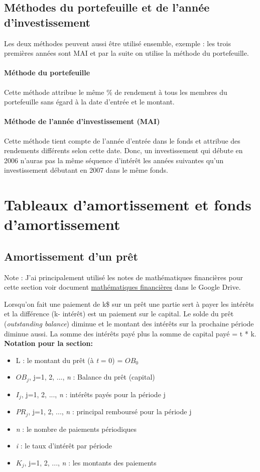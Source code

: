 \documentclass[11pt,french]{report}
\begin{document}
\section{Méthodes du portefeuille et de l'année d'investissement}
\label{sec:portefeuille}
Les deux méthodes peuvent aussi être utilisé ensemble, exemple : les trois premières années sont MAI et par la suite on utilise la méthode du portefeuille.

\subsubsection{Méthode du portefeuille}
Cette méthode attribue le même \% de rendement à tous les membres du portefeuille sans égard à la date d'entrée et le montant.

\subsubsection{Méthode de l'année d'investissement (MAI)}
Cette méthode tient compte de l'année d'entrée dans le fonds et attribue des rendements différents selon cette date. Donc, un investissement qui débute en 2006 n'auras pas la même séquence d'intérêt les années suivantes qu'un investissement débutant en 2007 dans le même fonds.



\chapter{Tableaux d'amortissement et fonds d'amortissement}

\section{Amortissement d'un prêt}
Note : J'ai principalement utilisé les notes de mathématiques financières pour cette section voir document \href{https://drive.google.com/open?id=0B6kXivc6X9LITmdBVFVWSDAxeE0}{mathématiques financières} dans le Google Drive.

Lorsqu'on fait une paiement de k\$ sur un prêt une partie sert à payer les intérêts et la différence (k- intérêt) est un paiement sur le capital. Le solde du prêt (\emph{outstanding balance}) diminue et le montant des intérêts sur la prochaine période diminue aussi. La somme des intérêts payé plus la somme de capital payé = t * k.
\textbf{Notation pour la section:}
\begin{itemize}
\item L : le montant du prêt (à \textit{t} = 0) = $OB_0$
\item $OB_j$, j=1, 2, ..., \textit{n} : Balance du prêt (capital)
\item $I_j$, j=1, 2, ..., \textit{n} : intérêts payés pour la période j
\item $PR_j$, j=1, 2, ..., \textit{n} : principal remboursé pour la période j
\item \textit{n} : le nombre de paiements périodiques 
\item \textit{i} : le taux d'intérêt par période
\item $K_j$, j=1, 2, ..., \textit{n} : les montants des paiements
\end{itemize}
\end{document}
